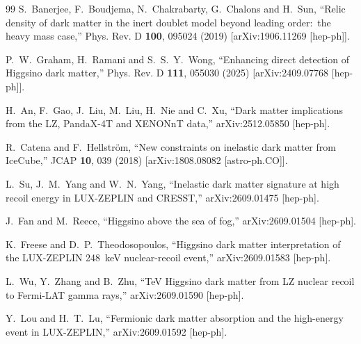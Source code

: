 \documentclass[aps,prd,twocolumn,nofootinbib,superscriptaddress]{revtex4-2}
\begin{document}
\begin{thebibliography}{99}
S.~Banerjee, F.~Boudjema, N.~Chakrabarty, G.~Chalons and H.~Sun,
``Relic density of dark matter in the inert doublet model beyond leading order:\ the heavy mass case,''
Phys. Rev. D \textbf{100}, 095024 (2019)
[arXiv:1906.11269 [hep-ph]].

P.~W.~Graham, H.~Ramani and S.~S.~Y.~Wong,
``Enhancing direct detection of Higgsino dark matter,''
Phys. Rev. D \textbf{111}, 055030 (2025)
[arXiv:2409.07768 [hep-ph]].

H.~An, F.~Gao, J.~Liu, M.~Liu, H.~Nie and C.~Xu,
``Dark matter implications from the LZ, PandaX-4T and XENONnT data,''
arXiv:2512.05850 [hep-ph].

R.~Catena and F.~Hellstr{\"o}m,
``New constraints on inelastic dark matter from IceCube,''
JCAP \textbf{10}, 039 (2018)
[arXiv:1808.08082 [astro-ph.CO]].

L.~Su, J.~M.~Yang and W.~N.~Yang,
``Inelastic dark matter signature at high recoil energy in LUX-ZEPLIN and CRESST,''
arXiv:2609.01475 [hep-ph].

J.~Fan and M.~Reece,
``Higgsino above the sea of fog,''
arXiv:2609.01504 [hep-ph].

K.~Freese and D.~P.~Theodosopoulos,
``Higgsino dark matter interpretation of the LUX-ZEPLIN 248~keV nuclear-recoil event,''
arXiv:2609.01583 [hep-ph].

L.~Wu, Y.~Zhang and B.~Zhu,
``TeV Higgsino dark matter from LZ nuclear recoil to Fermi-LAT gamma rays,''
arXiv:2609.01590 [hep-ph].

Y.~Lou and H.~T.~Lu,
``Fermionic dark matter absorption and the high-energy event in LUX-ZEPLIN,''
arXiv:2609.01592 [hep-ph].

\end{thebibliography}
\end{document}
